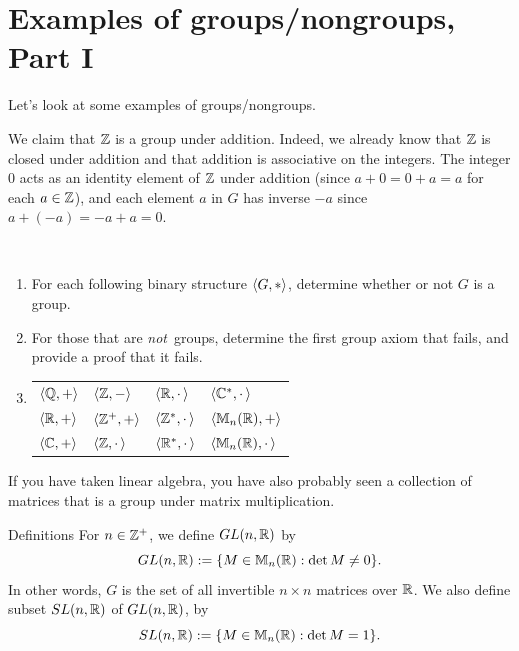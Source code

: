 \section{Examples of groups/nongroups, Part I}
Let's look at some examples of groups/nongroups.

\begin{example}{}
We claim that $\mathbb{Z}$ is a group under addition.  Indeed, we already
know that $\mathbb{Z}$ is closed under addition and that addition is
associative on the integers.  The integer $0$ acts as an identity
element of $\mathbb{Z}$ under addition (since $a+0=0+a=a$ for each $a\in
\mathbb{Z}$), and each element $a$ in $G$ has inverse $-a$ since
$a+(-a)=-a+a=0$. \end{example}

\begin{example}{}\
\begin{enumerate}
\item  For each following binary structure $\langle G,*\rangle$, determine whether or not $G$ is a group.
\item For those that are \textit{not\,} groups, determine the first group axiom  that fails, and provide a proof that it fails.

\item[]
\begin{center}
\begin{tabular}{p{1in}p{1in}p{1in}p{1in}}
$\langle\mathbb{Q},+\rangle$ & $\langle\mathbb{Z},-\rangle$ & $\langle\mathbb{R},\cdot\,\rangle$ & $\langle\mathbb{C}^*,\cdot\, \rangle$\\
$\langle\mathbb{R},+\rangle$ & $\langle\mathbb{Z}^+,+\rangle$ & $\langle\mathbb{Z}^*,\cdot\,\rangle$ & $\langle\mathbb{M}_n(\mathbb{R}),+\rangle$\\
$\langle\mathbb{C},+\rangle$ & $\langle\mathbb{Z}, \cdot\,\rangle$ & $\langle\mathbb{R}^*,\cdot\, \rangle$ & $\langle\mathbb{M}_n(\mathbb{R}),\cdot\, \rangle$
\end{tabular}
\end{center}
\end{enumerate}
\end{example}


\noindent If you have taken
linear algebra, you have also probably seen a collection of matrices
that is a group under matrix multiplication.


\begin{df}{Definitions} For $n\in \mathbb{Z}^+$, we define $GL(n,\mathbb{R})$ by
$$GL(n,\mathbb{R}):=\{M\in \mathbb{M}_n(\mathbb{R}):\det M \neq 0\}.$$ In other
words, $G$ is the set of all invertible $n\times n$ matrices
over $\mathbb{R}$. We also define subset $SL(n,\mathbb{R})$ of
$GL(n,\mathbb{R})$, by
$$SL(n,\mathbb{R}):=\{M\in \mathbb{M}_n(\mathbb{R}):\det M =1\}.$$\end{df}

